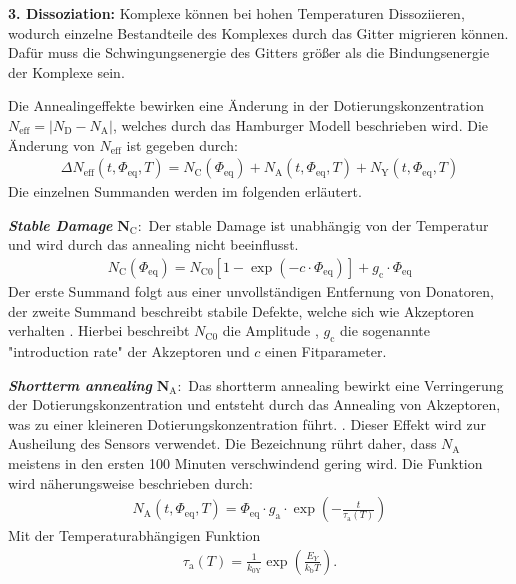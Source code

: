 \textbf{3. Dissoziation:} Komplexe können bei hohen Temperaturen Dissoziieren, wodurch einzelne Bestandteile des Komplexes
durch das Gitter migrieren können. Dafür muss die Schwingungsenergie des Gitters größer als die Bindungsenergie der Komplexe sein.

Die Annealingeffekte bewirken eine Änderung in der Dotierungskonzentration $N_{\mathrm{eff}}= |N_{\mathrm{D}}-N_{\mathrm{A}}|$, welches durch das Hamburger Modell beschrieben wird.
Die Änderung von $N_{\mathrm{eff}}$ ist gegeben durch:
\begin{align}
  \Delta N_{\mathrm{eff}}(t, \Phi_{\mathrm{eq}}, T)   = N_{\mathrm{C}}(\Phi_{\mathrm{eq}}) + N_{\mathrm{A}}(t, \Phi_{\mathrm{eq}}, T) + N_{\mathrm{Y}}(t, \Phi_{\mathrm{eq}}, T) \label{eqn:N_eff}
\end{align}
Die einzelnen Summanden werden im folgenden erläutert.

\textbf{\textit{Stable Damage}} $\symbf{N_{\mathrm{C}}}:$ Der stable Damage ist unabhängig von der Temperatur und wird durch das annealing nicht beeinflusst.
\begin{align}
  N_{\mathrm{C}}(\Phi_{\mathrm{eq}}) = N_{\mathrm{C0}}[1-\exp{(-c \cdot \Phi_{\mathrm{eq}})}] + g_{\mathrm{c}} \cdot \Phi_{\mathrm{eq}}
\end{align}
Der erste Summand folgt aus einer unvollständigen Entfernung von Donatoren, der zweite Summand beschreibt stabile Defekte, welche sich wie Akzeptoren verhalten \cite{beyer}.
Hierbei beschreibt $N_{\mathrm{C0}}$ die Amplitude , $g_{\mathrm{c}}$ die sogenannte "introduction rate" der Akzeptoren und $c$ einen Fitparameter.

\textbf{\textit{Shortterm annealing}} $\symbf{N_{\mathrm{A}}}:$ Das shortterm annealing bewirkt eine Verringerung der Dotierungskonzentration und entsteht durch
das Annealing von Akzeptoren, was zu einer kleineren Dotierungskonzentration führt. . Dieser Effekt wird
zur Ausheilung des Sensors verwendet. Die Bezeichnung rührt daher, dass $N_{\mathrm{A}}$ meistens in den ersten 100 Minuten verschwindend gering wird. Die
Funktion wird näherungsweise beschrieben durch:
\begin{align}
  N_{\mathrm{A}}(t, \Phi_{\mathrm{eq}}, T) = \Phi_{\mathrm{eq}} \cdot g_{\mathrm{a}} \cdot \exp{\left(-\frac{t}{\tau_{\mathrm{a}}(T)}\right)}
\end{align}
Mit der Temperaturabhängigen Funktion
\begin{align}
  \tau_{\mathrm{a}}(T) = \frac{1}{k_{0\mathrm{Y}}}\exp{\left(\frac{E_{Y}}{k_{\mathrm{b}}T}\right)}.
\end{align}

